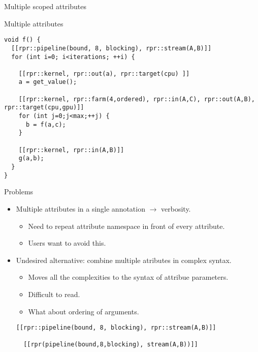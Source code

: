 \begin{frame}[t,fragile]{Multiple scoped attributes }

\begin{block}{Multiple attributes}
\begin{lstlisting}[basicstyle=\scriptsize]
void f() {
  [[rpr::pipeline(bound, 8, blocking), rpr::stream(A,B)]]
  for (int i=0; i<iterations; ++i) {

    [[rpr::kernel, rpr::out(a), rpr::target(cpu) ]]
    a = get_value();
    
    [[rpr::kernel, rpr::farm(4,ordered), rpr::in(A,C), rpr::out(A,B), rpr::target(cpu,gpu)]]
    for (int j=0;j<max;++j) {
      b = f(a,c);
    }

    [[rpr::kernel, rpr::in(A,B)]]
    g(a,b);
  }
}
\end{lstlisting}
\end{block}
\end{frame}

\begin{frame}[t,fragile]{Problems}
\begin{itemize}
  \item Multiple attributes in a single annotation $\rightarrow$ verbosity.
    \begin{itemize}
      \item Need to repeat attribute namespace in front of every attribute.
      \item Users want to avoid this.
    \end{itemize}
  \vfill\pause
  \item Undesired alternative: combine multiple atributes in complex syntax.
    \begin{itemize}
      \item Moves all the complexities to the syntax of attribue parameters.
      \item Difficult to read.
      \item What about ordering of arguments.
    \end{itemize}
\begin{lstlisting}[basicstyle=\scriptsize]
  [[rpr::pipeline(bound, 8, blocking), rpr::stream(A,B)]]

  [[rpr(pipeline(bound,8,blocking), stream(A,B))]]
\end{lstlisting}
\end{itemize}
\end{frame}

